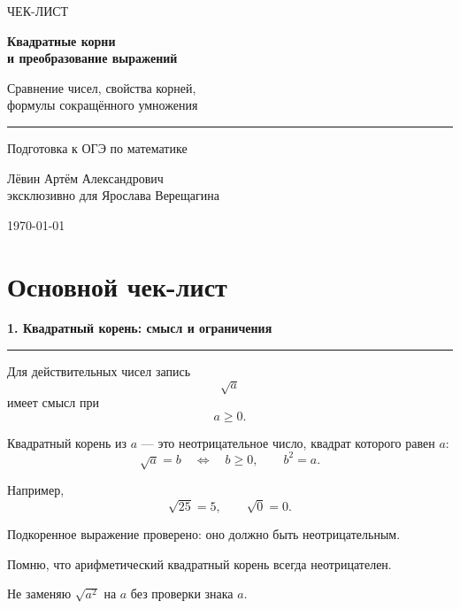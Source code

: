 \documentclass[a4paper,12pt]{article}
\newcommand{\topic}[1]{%
    \vspace{0.7em}
    {\large\bfseries\color{darkaccent}#1}\par
    \vspace{0.25em}
    {\color{rulegray}\hrule}
    \vspace{0.65em}
}
\begin{document}
\begin{titlepage}
\thispagestyle{empty}
\begin{center}
\vspace*{2.1cm}
{\Large\color{softgray}ЧЕК-ЛИСТ}
\vspace{0.7cm}

{\fontsize{25}{31}\selectfont\bfseries\color{darkaccent}
Квадратные корни\\[0.25em]
и преобразование выражений
}

\vspace{0.7cm}
{\large
Сравнение чисел, свойства корней,\\
формулы сокращённого умножения
}

\vspace{0.9cm}
{\color{accent}\rule{0.58\linewidth}{1pt}}
\vspace{1.1cm}

{\large Подготовка к ОГЭ по математике}
\vfill

{\large
Лёвин Артём Александрович\\[0.25em]
эксклюзивно для Ярослава Верещагина
}

\vspace{0.8cm}
{\large \today}
\vspace{1.4cm}

\end{center}
\end{titlepage}

\section*{\color{darkaccent}Основной чек-лист}

\topic{1. Квадратный корень: смысл и ограничения}

Для действительных чисел запись
\[
\sqrt{a}
\]
имеет смысл при
\[
a\ge 0.
\]

Квадратный корень из \(a\) --- это неотрицательное число, квадрат которого равен \(a\):
\[
\sqrt{a}=b
\quad\Longleftrightarrow\quad
b\ge0,\qquad b^2=a.
\]

Например,
\[
\sqrt{25}=5,
\qquad
\sqrt{0}=0.
\]

\begin{checklist}
    \item Подкоренное выражение проверено: оно должно быть неотрицательным.
    \item Помню, что арифметический квадратный корень всегда неотрицателен.
    \item Не заменяю \(\sqrt{a^2}\) на \(a\) без проверки знака \(a\).
\end{checklist}
\end{document}
